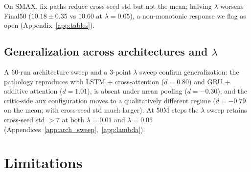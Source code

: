 \documentclass{article}
\theoremstyle{plain}
\theoremstyle{definition}
\theoremstyle{remark}
\begin{document}
On SMAX, fix paths reduce cross-seed std but not the mean; halving
$\lambda$ worsens Final50 ($10.18 \pm 0.35$ vs $10.60$ at $\lambda{=}0.05$),
a non-monotonic response we flag as open (Appendix~\ref{app:tables}).

\subsection{Generalization across architectures and $\lambda$}
\label{sec:arch_sweep}

A 60-run architecture sweep and a 3-point $\lambda$ sweep confirm
generalization: the pathology reproduces with LSTM + cross-attention
($d{=}0.80$) and GRU + additive attention ($d{=}1.01$), is absent
under mean pooling ($d{=}-0.30$), and the critic-side aux
configuration moves to a qualitatively different regime ($d{=}-0.79$
on the mean, with cross-seed std much larger). At 50M steps the
$\lambda$ sweep retains cross-seed std $>7$ at both $\lambda{=}0.01$
and $\lambda{=}0.05$
(Appendices~\ref{app:arch_sweep},~\ref{app:lambda}).




\section{Limitations}
\label{sec:limitations}
\end{document}
